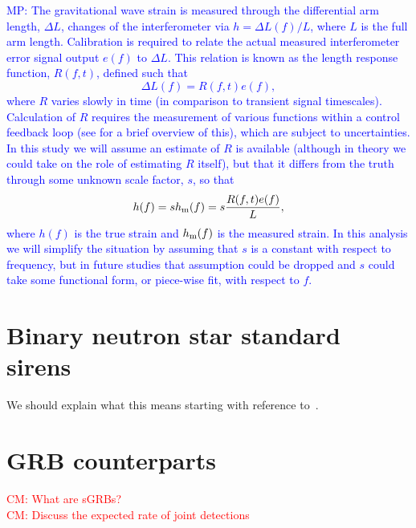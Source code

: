 \documentclass[10pt]{iopart}
\newcommand{\cm}[1]{\textcolor{red}{CM: #1}}
\newcommand{\MP}[1]{\textcolor{blue}{MP: #1}}
\begin{document}
\MP{The gravitational wave strain is measured through the differential arm length, $\Delta L$, changes
of the interferometer via $h = \Delta L(f) / L$, where $L$ is the full arm length.
Calibration is required to relate the actual measured interferometer error signal output
$e(f)$ to $\Delta L$. This relation is known as the length response function, $R(f,t)$,
defined such that
\begin{equation}
\Delta L(f) = R(f,t) e(f),
\end{equation}
where $R$ varies slowly in time (in comparison to transient signal timescales).
Calculation of $R$ requires the measurement of various functions within a control feedback loop
(see \cite{Vitale:2012} for a brief overview of this), which are subject to
uncertainties. In this study we will assume an estimate of $R$ is available (although
in theory we could take on the role of estimating $R$ itself), but that it differs from the
truth through some unknown scale factor, $s$, so that
\begin{equation}
h(f) = s h_{\rm m}(f) = s \frac{R(f,t) e(f)}{L},
\end{equation}
where $h(f)$ is the true strain and $h_{\rm m}(f)$ is the measured strain.
In this analysis we will simplify the situation by assuming that $s$ is a constant with
respect to frequency, but in future studies that assumption could be dropped and $s$
could take some functional form, or piece-wise fit, with respect to $f$.}

\section{Binary neutron star standard sirens\label{sec:sirens}}

We should explain what this means starting with reference
to~\cite{1986Natur.323..310S}.

\section{GRB counterparts\label{sec:GRB}}

\cm{What are sGRBs?}\\

\cm{Discuss the expected rate of joint detections}\\
\end{document}
